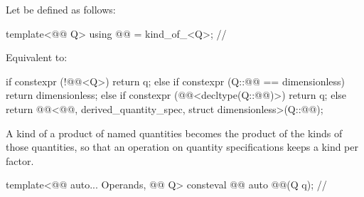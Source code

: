 \begin{itemdescr}
\pnum
Let  be defined as follows:
\begin{codeblock}
template<@@ Q>
using @@ = kind_of_<Q>;  // \expos
\end{codeblock}

\pnum
\effects
Equivalent to:
\begin{codeblock}
if constexpr (!@@<Q>)
  return q;
else if constexpr (Q::@@ == dimensionless)
  return dimensionless;
else if constexpr (@@<decltype(Q::@@)>)
  return q;
else
  return @@<@@, derived_quantity_spec, struct dimensionless>(Q::@@);
\end{codeblock}
\begin{note}
A kind of a product of named quantities becomes the product of the kinds of those quantities,
so that an operation on quantity specifications keeps a kind per factor.
\end{note}
\end{itemdescr}

\begin{itemdecl}
template<@@ auto... Operands, @@ Q>
consteval @@ auto @@(Q q);    // \expos
\end{itemdecl}

